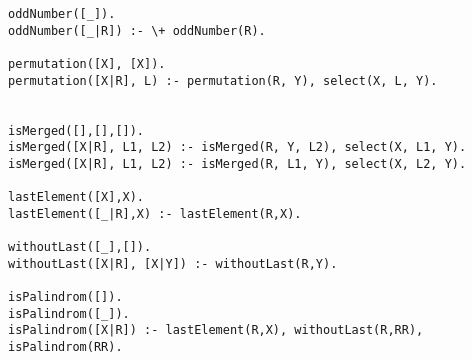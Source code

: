 \begin{verbatim}
oddNumber([_]).
oddNumber([_|R]) :- \+ oddNumber(R).

permutation([X], [X]).
permutation([X|R], L) :- permutation(R, Y), select(X, L, Y).


isMerged([],[],[]).
isMerged([X|R], L1, L2) :- isMerged(R, Y, L2), select(X, L1, Y).
isMerged([X|R], L1, L2) :- isMerged(R, L1, Y), select(X, L2, Y).

lastElement([X],X).
lastElement([_|R],X) :- lastElement(R,X).

withoutLast([_],[]).
withoutLast([X|R], [X|Y]) :- withoutLast(R,Y).

isPalindrom([]).
isPalindrom([_]).
isPalindrom([X|R]) :- lastElement(R,X), withoutLast(R,RR), isPalindrom(RR).
\end{verbatim}
